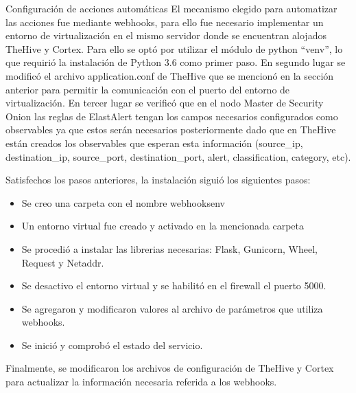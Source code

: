    \begin{section}{Configuración de acciones automáticas}
        El mecanismo elegido para automatizar las acciones fue mediante webhooks, para ello fue necesario implementar un entorno de virtualización en el mismo servidor donde se encuentran alojados TheHive y Cortex. Para ello se optó por utilizar el módulo de python “venv”, lo que requirió la instalación de Python 3.6 como primer paso. En segundo lugar se modificó el archivo application.conf de TheHive que se mencionó en la sección anterior para permitir la comunicación con el puerto  del entorno de virtualización. En tercer lugar se verificó que en el nodo Master de Security Onion las reglas de ElastAlert tengan los campos necesarios configurados como observables ya que estos serán necesarios posteriormente dado que en TheHive están creados los observables que esperan esta información (source\_ip, destination\_ip, source\_port, destination\_port, alert, classification, category, etc). \par
        Satisfechos los pasos anteriores, la instalación siguió los siguientes pasos:
        \begin{itemize}
            \item Se creo una carpeta con el nombre webhooksenv
            \item Un entorno virtual fue creado y activado en la mencionada carpeta
            \item Se procedió a instalar las librerias necesarias: Flask, Gunicorn, Wheel, Request y Netaddr.
            \item Se desactivo el entorno virtual y se habilitó en el firewall el puerto 5000.
            \item Se agregaron y modificaron valores al archivo de parámetros que utiliza webhooks.
            \item Se inició y comprobó el estado del servicio.
        \end{itemize}
        Finalmente, se modificaron los archivos de configuración de TheHive y Cortex para actualizar la información necesaria referida a los webhooks.

   \end{section}